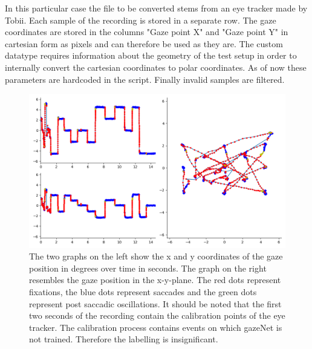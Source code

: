 \documentclass[conference]{IEEEtran}
\begin{document}
In this particular case the file to be converted stems from an eye tracker made by Tobii. Each sample of the recording is stored in a separate row. The gaze coordinates are stored in the columns "Gaze point X" and "Gaze point Y" in cartesian form as pixels and can therefore be used as they are. The custom datatype requires information about the geometry of the test setup in order to internally convert the cartesian coordinates to polar coordinates. As of now these parameters are hardcoded in the script. Finally invalid samples are filtered.

\begin{figure}[ht]
    \includegraphics[width=\linewidth]{Kreuze_Random Recording1_short}
    \caption{The two graphs on the left show the x and y coordinates of the gaze position in degrees over time in seconds. The graph on the right resembles the gaze position in the x-y-plane. The red dots represent fixations, the blue dots represent saccades and the green dots represent post saccadic oscillations. It should be noted that the first two seconds of the recording contain the calibration points of the eye tracker. The calibration process contains events on which gazeNet is not trained. Therefore the labelling is insignificant.}
\end{figure}
\end{document}
